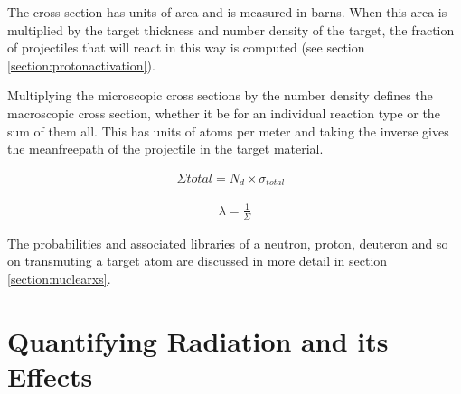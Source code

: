 The cross section has units of area and is measured in \gls{barn}s.  When this area is multiplied by the target thickness and number density of the target, the fraction of projectiles that will react in this way is computed (see section \ref{section:protonactivation}).

Multiplying the microscopic cross sections by the number density defines the macroscopic cross section, whether it be for an individual reaction type or the sum of them all.  This has units of atoms per meter and taking the inverse gives the \gls{meanfreepath} of the projectile in the target material.

\begin{minipage}[b]{0.49\linewidth}
\begin{center}
\begin{equation}
\begin{split}
\Sigma{total} = N_{d} \times \sigma_{total} \text{    } 
\end{split}
\label{eq:totalmicroscopic}
\end{equation}
\end{center}
\end{minipage}
\begin{minipage}[b]{0.49\linewidth}
\begin{center}
\begin{equation}
\begin{split}
\lambda = \frac{1}{\Sigma}
\end{split}
\label{eq:totalmicroscopic}
\end{equation}
\end{center}
\end{minipage}

The probabilities and associated libraries of a neutron, proton, deuteron and so on transmuting a target atom are discussed in more detail in section \ref{section:nuclearxs}.


\FloatBarrier




\section{Quantifying Radiation and its Effects}

